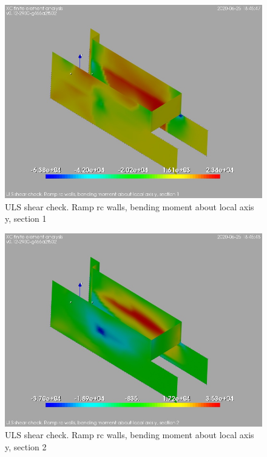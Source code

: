 \begin{figure}
\begin{center}
\includegraphics[width=\linewidth]{ramp_wall/resLC/text/graphics/shearULS/wallsMySect1}
\caption{ULS shear check. Ramp rc walls, bending moment about local axis y, section 1}
\end{center}
\end{figure}
\begin{figure}
\begin{center}
\includegraphics[width=\linewidth]{ramp_wall/resLC/text/graphics/shearULS/wallsMySect2}
\caption{ULS shear check. Ramp rc walls, bending moment about local axis y, section 2}
\end{center}
\end{figure}

